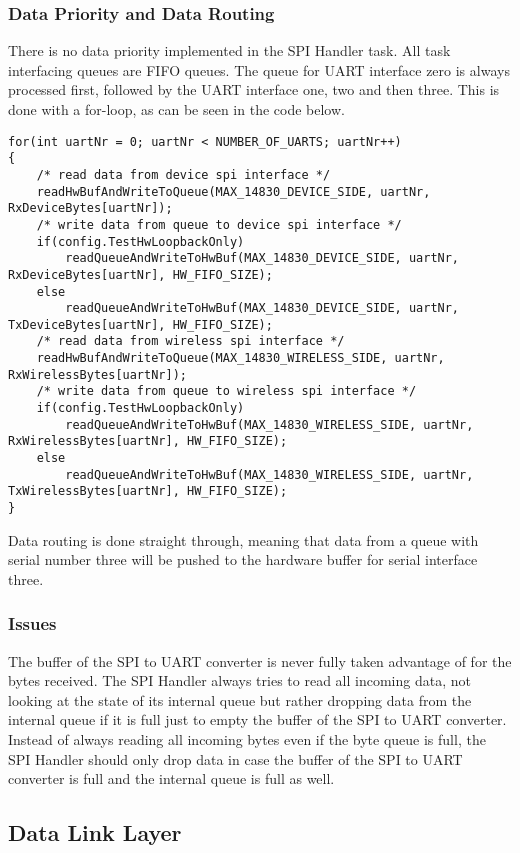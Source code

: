 \subsubsection{Data Priority and Data Routing}
There is no data priority implemented in the SPI Handler task. All task interfacing queues are FIFO queues. The queue for UART interface zero is always processed first, followed by the UART interface one, two and then three. This is done with a for-loop, as can be seen in the code below.
\begin{lstlisting}
for(int uartNr = 0; uartNr < NUMBER_OF_UARTS; uartNr++)
{
    /* read data from device spi interface */
    readHwBufAndWriteToQueue(MAX_14830_DEVICE_SIDE, uartNr, RxDeviceBytes[uartNr]);
    /* write data from queue to device spi interface */
    if(config.TestHwLoopbackOnly)
        readQueueAndWriteToHwBuf(MAX_14830_DEVICE_SIDE, uartNr, RxDeviceBytes[uartNr], HW_FIFO_SIZE);
    else
        readQueueAndWriteToHwBuf(MAX_14830_DEVICE_SIDE, uartNr, TxDeviceBytes[uartNr], HW_FIFO_SIZE);
    /* read data from wireless spi interface */
    readHwBufAndWriteToQueue(MAX_14830_WIRELESS_SIDE, uartNr, RxWirelessBytes[uartNr]);
    /* write data from queue to wireless spi interface */
    if(config.TestHwLoopbackOnly)
        readQueueAndWriteToHwBuf(MAX_14830_WIRELESS_SIDE, uartNr, RxWirelessBytes[uartNr], HW_FIFO_SIZE);
    else
        readQueueAndWriteToHwBuf(MAX_14830_WIRELESS_SIDE, uartNr, TxWirelessBytes[uartNr], HW_FIFO_SIZE);
}
\end{lstlisting}
Data routing is done straight through, meaning that data from a queue with serial number three will be pushed to the hardware buffer for serial interface three.
\subsubsection{Issues}
The buffer of the SPI to UART converter is never fully taken advantage of for the bytes received. The SPI Handler always tries to read all incoming data, not looking at the state of its internal queue but rather dropping data from the internal queue if it is full just to empty the buffer of the SPI to UART converter.\\
Instead of always reading all incoming bytes even if the byte queue is full, the SPI Handler should only drop data in case the buffer of the SPI to UART converter is full and the internal queue is full as well.
%
%
\subsection{Data Link Layer}
